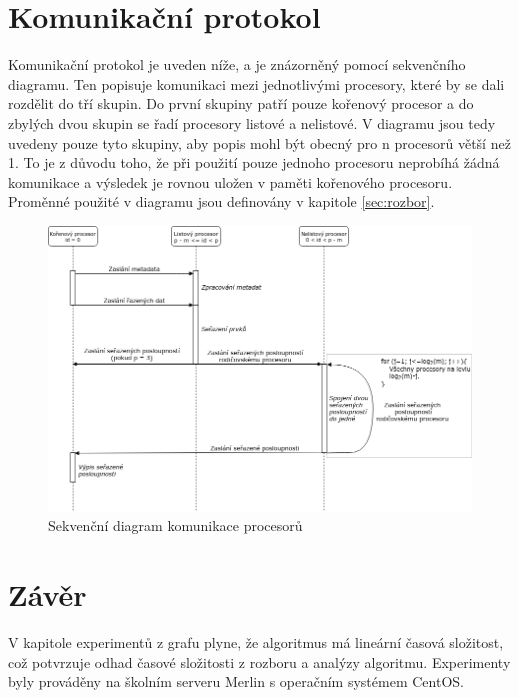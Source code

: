 \documentclass[12pt, a4paper]{article}
\begin{document}
\section{Komunikační protokol}
Komunikační protokol je uveden níže, a je znázorněný pomocí sekvenčního diagramu. Ten popisuje komunikaci mezi jednotlivými procesory, které by se dali rozdělit do tří skupin. Do první skupiny patří pouze kořenový procesor a do zbylých dvou skupin se řadí procesory listové a nelistové. V diagramu jsou tedy uvedeny pouze tyto skupiny, aby popis mohl být obecný pro n procesorů větší než 1. To je z důvodu toho, že při použití pouze jednoho procesoru neprobíhá žádná komunikace a výsledek je rovnou uložen v paměti kořenového procesoru. Proměnné použité v diagramu jsou definovány v kapitole \ref{sec:rozbor}.

\begin{figure}[H]
	\centering
	\includegraphics[scale=0.53]{pics/seq.png}
	\caption{Sekvenční diagram komunikace procesorů}	
\end{figure}


\section{Závěr}
V kapitole experimentů z grafu plyne, že algoritmus má lineární časová složitost, což potvrzuje odhad časové složitosti z rozboru a analýzy algoritmu. Experimenty byly prováděny na školním serveru Merlin s operačním systémem CentOS.
\end{document}
